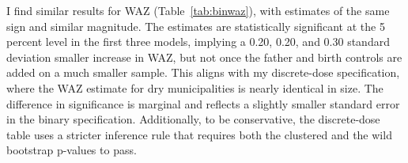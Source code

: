 \documentclass[12pt]{article}
\begin{document}
I find similar results for WAZ (Table~\ref{tab:binwaz}), with estimates of the same sign and similar magnitude. The estimates are statistically significant at the 5 percent level in the first three models, implying a 0.20, 0.20, and 0.30 standard deviation smaller increase in WAZ, but not once the father and birth controls are added on a much smaller sample. This aligns with my discrete-dose specification, where the WAZ estimate for dry municipalities is nearly identical in size. The difference in significance is marginal and reflects a slightly smaller standard error in the binary specification. Additionally, to be conservative, the discrete-dose table uses a stricter inference rule that requires both the clustered and the wild bootstrap p-values to pass.

\begingroup\singlespacing
\begingroup
\footnotesize
\renewcommand{\arraystretch}{0.86}
\setlength{\tabcolsep}{4pt}
\setlength{\LTcapwidth}{\textwidth}
\end{document}
